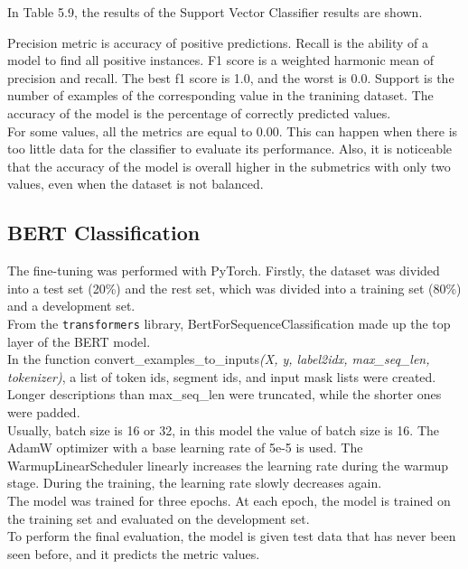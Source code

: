 \documentclass[times, utf8, zavrsni, english]{fer}
\begin{document}
In Table 5.9, the results of the Support Vector Classifier results are shown. 

Precision metric is accuracy of positive predictions. Recall is the ability of a model to find all positive instances. F1 score is a weighted harmonic mean of precision and recall. The best f1 score is 1.0, and the worst is 0.0. Support is the number of examples of the corresponding value in the tranining dataset.
The accuracy of the model is the percentage of correctly predicted values. \\

For some values, all the metrics are equal to 0.00. This can happen when there is too little data for the classifier to evaluate its performance. Also, it is noticeable that the accuracy of the model is overall higher in the submetrics with only two values, even when the dataset is not balanced.


\subsection{BERT Classification}
The fine-tuning was performed with PyTorch.
Firstly, the dataset was divided into a test set (20\%) and the rest set, which was divided into a training set (80\%) and a development set.\\
From the \texttt{transformers} library, BertForSequenceClassification made up the top layer of the BERT model.\\
In the function convert\_examples\_to\_inputs\textit{(X, y, label2idx, max\_seq\_len, tokenizer)}, a list of token ids, segment ids, and input mask lists were created. Longer descriptions than max\_seq\_len were truncated, while the shorter ones were padded. \\
Usually, batch size is 16 or 32, in this model the value of batch size is 16.
The AdamW optimizer with a base learning rate of 5e-5  is used. The WarmupLinearScheduler linearly increases the learning rate during the warmup stage. During the training, the learning rate slowly decreases again.\\
The model was trained for three epochs.
At each epoch, the model is trained on the training set and evaluated on the development set. \\
To perform the final evaluation, the model is given test data that has never been seen before, and it predicts the metric values. \\
\end{document}
